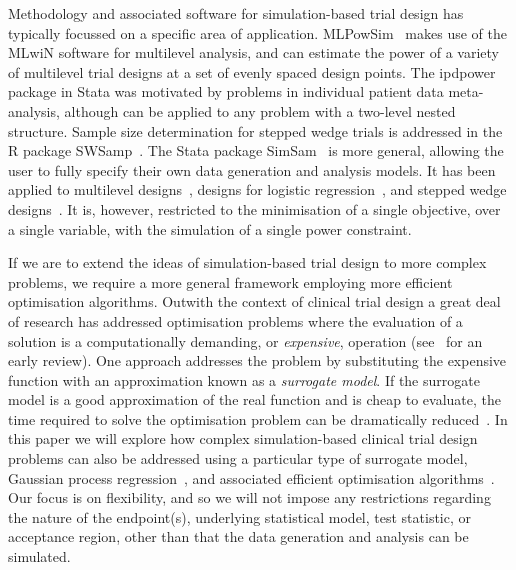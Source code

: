 \documentclass{article} %
\begin{document}

Methodology and associated software for simulation-based trial design has typically focussed on a specific area of application. MLPowSim~\cite{Browne2009} makes use of the MLwiN software for multilevel analysis, and can estimate the power of a variety of multilevel trial designs at a set of evenly spaced design points. The ipdpower package in Stata was motivated by problems in individual patient data meta-analysis, although can be applied to any problem with a two-level nested structure. Sample size determination for stepped wedge trials is addressed in the R package SWSamp~\cite{Baio2015}. The Stata package SimSam~\cite{Hooper2013} is more general, allowing the user to fully specify their own data generation and analysis models. It has been applied to multilevel designs~\cite{Hooper2013}, designs for logistic regression~\cite{Grieve2016}, and stepped wedge designs~\cite{Hooper2016}. It is, however, restricted to the minimisation of a single objective, over a single variable, with the simulation of a single power constraint. 

If we are to extend the ideas of simulation-based trial design to more complex problems, we require a more general framework employing more efficient optimisation algorithms. Outwith the context of clinical trial design a great deal of research has addressed optimisation problems where the evaluation of a solution is a computationally demanding, or \emph{expensive}, operation (see~\cite{Sacks1989} for an early review). One approach addresses the problem by substituting the expensive function with an approximation known as a \emph{surrogate model}. If the surrogate model is a good approximation of the real function and is cheap to evaluate, the time required to solve the optimisation problem can be dramatically reduced~\cite{Jones2001}.  In this paper we will explore how complex simulation-based clinical trial design problems can also be addressed using a particular type of surrogate model, Gaussian process regression~\cite{Rasmussen2006}, and associated efficient optimisation algorithms~\cite{Jones2001}. Our focus is on flexibility, and so we will not impose any restrictions regarding the nature of the endpoint(s), underlying statistical model, test statistic, or acceptance region, other than that the data generation and analysis can be simulated.
\end{document}
